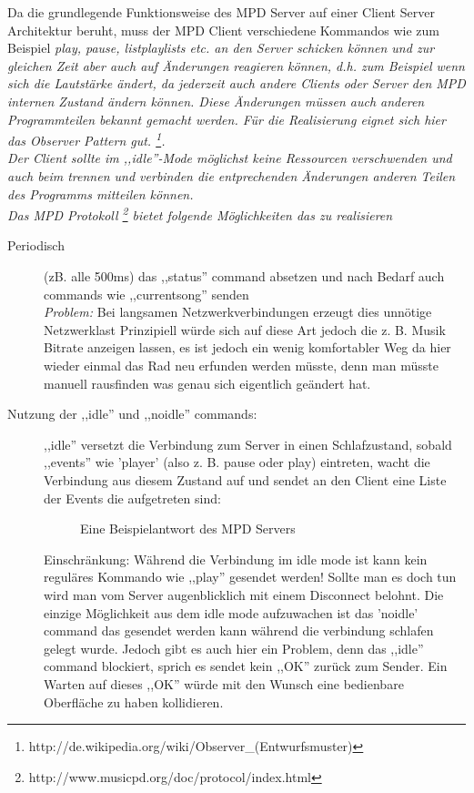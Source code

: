 Da die grundlegende Funktionsweise des MPD Server auf einer Client Server Architektur beruht, muss der MPD Client
verschiedene Kommandos wie zum Beispiel \it play, pause, listplaylists \rm etc. an den Server schicken können
und zur gleichen Zeit aber auch auf Änderungen reagieren können, d.h. zum Beispiel wenn sich die Lautstärke ändert,
da jederzeit auch andere Clients oder Server den MPD internen Zustand ändern können.
Diese Änderungen müssen auch anderen Programmteilen bekannt gemacht werden.
Für die Realisierung eignet sich hier das Observer Pattern gut. \footnote{http://de.wikipedia.org/wiki/Observer\_(Entwurfsmuster)}.
\\
Der Client sollte im ,,idle''-Mode möglichst keine Ressourcen verschwenden und auch beim 
trennen und verbinden die entprechenden Änderungen anderen Teilen des Programms mitteilen
können. 
\\

Das MPD Protokoll \footnote{http://www.musicpd.org/doc/protocol/index.html} bietet folgende Möglichkeiten das zu realisieren
\begin{description}
    \item [Periodisch] (zB. alle 500ms) das ,,status'' command absetzen und nach Bedarf auch commands wie ,,currentsong''
        senden
        \\
        \emph{Problem:} Bei langsamen Netzwerkverbindungen erzeugt dies unnötige Netzwerklast 
        Prinzipiell würde sich auf diese Art jedoch die z. B. Musik Bitrate anzeigen lassen, es ist jedoch ein
        wenig komfortabler Weg da hier wieder einmal das Rad neu erfunden werden müsste, denn man müsste manuell rausfinden 
        was genau sich eigentlich geändert hat.
    \item [Nutzung der ,,idle'' und ,,noidle'' commands:]
        ,,idle'' versetzt die Verbindung zum Server in einen Schlafzustand, sobald ,,events'' wie 'player' (also z. B. pause oder play) 
        eintreten, wacht die Verbindung aus diesem Zustand auf und sendet an den Client eine Liste der Events die aufgetreten sind:

\begin{figure}[h!]
    
\caption{Eine Beispielantwort des MPD Servers}
\label{dd_state}
\end{figure}

        Einschränkung: Während die Verbindung im idle mode ist kann kein reguläres Kommando wie ,,play'' gesendet werden!
        Sollte man es doch tun wird man vom Server augenblicklich mit einem Disconnect belohnt.
        Die einzige Möglichkeit aus dem idle mode aufzuwachen ist das 'noidle' command das gesendet werden
        kann während die verbindung schlafen gelegt wurde.
        Jedoch gibt es auch hier ein Problem, denn das ,,idle'' command blockiert, sprich es sendet kein ,,OK'' zurück zum Sender.
        Ein Warten auf dieses ,,OK'' würde mit den Wunsch eine bedienbare Oberfläche zu haben kollidieren.
\end{description}

